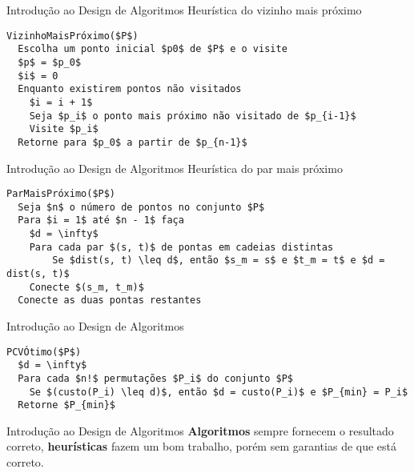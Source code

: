 \documentclass[10pt]{beamer}
\begin{document}
\begin{frame}[fragile]{Introdução ao Design de Algoritmos}
    \Large Heurística do vizinho mais próximo
    \normalsize
    \begin{lstlisting}
VizinhoMaisPróximo($P$)
  Escolha um ponto inicial $p0$ de $P$ e o visite
  $p$ = $p_0$
  $i$ = 0
  Enquanto existirem pontos não visitados
    $i = i + 1$
    Seja $p_i$ o ponto mais próximo não visitado de $p_{i-1}$
    Visite $p_i$
  Retorne para $p_0$ a partir de $p_{n-1}$
    \end{lstlisting}
\end{frame}

\begin{frame}[fragile]{Introdução ao Design de Algoritmos}
    \Large Heurística do par mais próximo
    \normalsize
    \begin{lstlisting}
ParMaisPróximo($P$)
  Seja $n$ o número de pontos no conjunto $P$
  Para $i = 1$ até $n - 1$ faça
    $d = \infty$
    Para cada par $(s, t)$ de pontas em cadeias distintas
        Se $dist(s, t) \leq d$, então $s_m = s$ e $t_m = t$ e $d = dist(s, t)$
    Conecte $(s_m, t_m)$
  Conecte as duas pontas restantes
    \end{lstlisting}
\end{frame}

\begin{frame}[fragile]{Introdução ao Design de Algoritmos}
    \begin{lstlisting}
PCVÓtimo($P$)
  $d = \infty$
  Para cada $n!$ permutações $P_i$ do conjunto $P$
    Se $(custo(P_i) \leq d)$, então $d = custo(P_i)$ e $P_{min} = P_i$
  Retorne $P_{min}$
    \end{lstlisting}
    
    
    \bigskip
    
    
    \bigskip
    
\end{frame}

\begin{frame}{Introdução ao Design de Algoritmos}
    \huge
    \textbf{Algoritmos} \alert{sempre} fornecem o resultado correto, \textbf{heurísticas} fazem um bom trabalho, porém sem garantias de que está correto.
\end{frame}
\end{document}
